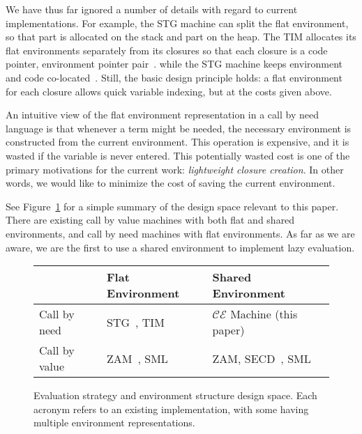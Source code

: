 We have thus far ignored a number of details with regard to current
implementations. For example, the STG machine can split the flat environment, so
that part is allocated on the stack and part on the heap.  The TIM allocates its
flat environments separately from its closures so that each closure is a code
pointer, environment pointer pair~\cite{TIM}. while the STG machine keeps
environment and code co-located~\cite{jonesstg}. Still, the basic design
principle holds: a flat environment for each closure allows quick variable
indexing, but at the costs given above.

An intuitive view of the flat environment representation in a call by need
language is that whenever a term might be needed, the necessary environment is
constructed from the current environment.  This operation is expensive, and
it is wasted if the variable is never entered. This potentially wasted cost is
one of the primary motivations for the current work: \emph{lightweight
closure creation}. In other words, we would like to minimize the cost of saving
the current environment.

See Figure~\ref{fig:designspace} for a simple summary of the design space
relevant to this paper. There are existing call by value machines with both flat
and shared environments, and call by need machines with flat environments. As
far as we are aware, we are the first to use a shared environment to implement
lazy evaluation.

\begin{figure}
\begin{tabular}{l | l | l}
                & Flat Environment     & Shared Environment \\ \hline
  Call by need  & STG~\cite{jonesstg}, TIM~\cite{TIM} & $\mathcal{CE}$ Machine (this paper) \\
  Call by value & ZAM~\cite{leroy1990zinc}, SML~\cite{appel1991standard} & ZAM, SECD~\cite{landin1964mechanical}, SML \\
\end{tabular}
\caption{Evaluation strategy and environment structure design space. Each
acronym refers to an existing implementation, with some having multiple environment
representations.}
\label{fig:designspace}
\end{figure}

